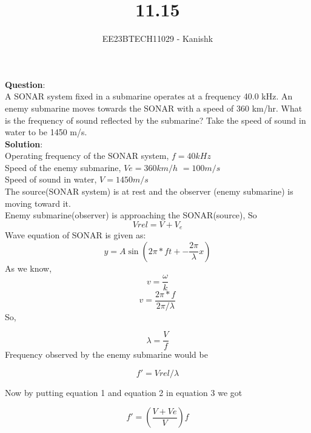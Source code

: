 \documentclass[journal,12pt,twocolumn]{IEEEtran}
\theoremstyle{remark}
\begin{document}

\vspace{3cm}

\title{11.15}
\author{EE23BTECH11029 - Kanishk}
\maketitle
\newpage

\bigskip

\renewcommand{\thefigure}{\theenumi}
\renewcommand{\thetable}{\theenumi}
\textbf{Question}:\\ 
A SONAR system fixed in a submarine operates at a frequency 40.0 kHz. An enemy submarine moves towards the SONAR with a speed of 360 km/hr. What is the frequency of sound reflected by the submarine? Take the speed of sound in water to be 1450 m/s.\\

\textbf{Solution}:\\
Operating frequency of the SONAR system, $f=40kHz$\\
Speed of the enemy submarine, $Ve=360km/h$ $=100m/s$\\
Speed of sound in water, $V=1450 m/s$\\
The source(SONAR system) is at rest and the observer (enemy submarine) is moving toward it. \\
Enemy submarine(observer) is approaching the SONAR(source), So 
\begin{equation}
Vrel=V+V_e
\end{equation}
Wave equation of SONAR is given as:\\
\begin{equation}
y=A\sin(2\pi*ft+-\frac{2\pi}{\lambda}x)
\end{equation}
As we know,
\begin{equation}
v=\frac{\omega}{k}
\end{equation}
$$v=\frac{2\pi*f}{2\pi/\lambda}$$
So,

\begin{equation}
\lambda=\frac{V}{f}
\end{equation}
Frequency observed by the enemy submarine would be

\begin{equation}
f'=Vrel/\lambda
\end{equation}

Now by putting equation 1 and equation 2 in equation 3 we got

\begin{equation}
f'=(\frac{V+Ve}{V})f
\end{equation}
\end{document}
